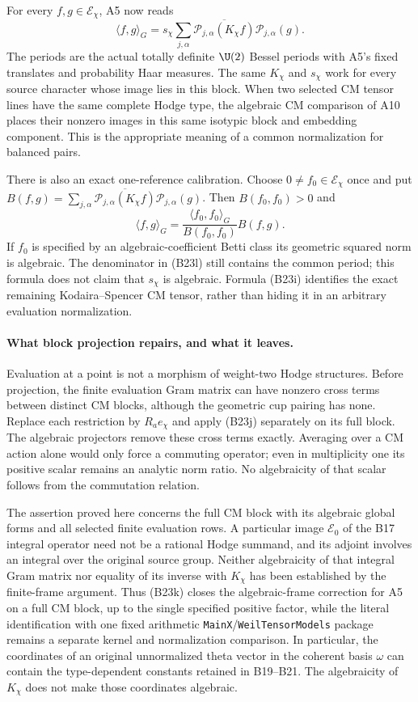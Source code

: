 \documentclass[11pt]{article}
\theoremstyle{definition}\newtheorem{definition}[theorem]{Definition}\newtheorem{remark}[theorem]{Remark}
\begin{document}
For every $f,g\in\mathcal E_\chi$, A5 now reads
\[
 \langle f,g\rangle_G
   =s_\chi\sum_{j,\alpha}
       \overline{\mathcal P_{j,\alpha}(K_\chi f)}
                       \mathcal P_{j,\alpha}(g).
 \tag{B23k}
\]
The periods are the actual totally definite $\U(2)$
Bessel periods with A5's fixed translates and probability
Haar measures.  The same $K_\chi$ and $s_\chi$ work for
every source character whose image lies in this block.
When two selected CM tensor lines have the same complete
Hodge type, the algebraic CM comparison of A10 places
their nonzero images in this same isotypic block and
embedding component.  This is the appropriate meaning
of a common normalization for balanced pairs.

There is also an exact one-reference calibration.
Choose $0\ne f_0\in\mathcal E_\chi$ once and put
$B(f,g)=\sum_{j,\alpha}
\overline{\mathcal P_{j,\alpha}(K_\chi f)}
\mathcal P_{j,\alpha}(g)$.  Then $B(f_0,f_0)>0$ and
\[
 \langle f,g\rangle_G
       =\frac{\langle f_0,f_0\rangle_G}{B(f_0,f_0)}
                           B(f,g).
 \tag{B23l}
\]
If $f_0$ is specified by an algebraic-coefficient Betti
class its geometric squared norm is algebraic.  The
denominator in (B23l) still contains the common period;
this formula does not claim that $s_\chi$ is algebraic.
Formula (B23i) identifies the exact remaining
Kodaira--Spencer CM tensor, rather than hiding it in
an arbitrary evaluation normalization.

\paragraph{What block projection repairs, and what it leaves.}
Evaluation at a point is not a morphism of weight-two
Hodge structures.  Before projection, the finite
evaluation Gram matrix can have nonzero cross terms
between distinct CM blocks, although the geometric
cup pairing has none.  Replace each restriction by
$R_ae_\chi$ and apply (B23j) separately on its full
block.  The algebraic projectors remove these cross
terms exactly.  Averaging over a CM action alone
would only force a commuting operator; even in
multiplicity one its positive scalar remains an
analytic norm ratio.  No algebraicity of that scalar
follows from the commutation relation.

The assertion proved here concerns the full CM block
with its algebraic global forms and all selected
finite evaluation rows.  A particular image
$\mathcal E_0$ of the B17 integral operator need not
be a rational Hodge summand, and its adjoint involves
an integral over the original source group.  Neither
algebraicity of that integral Gram matrix nor equality
of its inverse with $K_\chi$ has been established by
the finite-frame argument.  Thus (B23k) closes the
algebraic-frame correction for A5 on a full CM block,
up to the single specified positive factor, while
the literal identification with one fixed arithmetic
\texttt{MainX}/\texttt{WeilTensorModels} package remains
a separate kernel and normalization comparison.
In particular, the coordinates of an original unnormalized
theta vector in the coherent basis $\omega$ can contain
the type-dependent constants retained in B19--B21.
The algebraicity of $K_\chi$ does not make those
coordinates algebraic.
\end{document}
